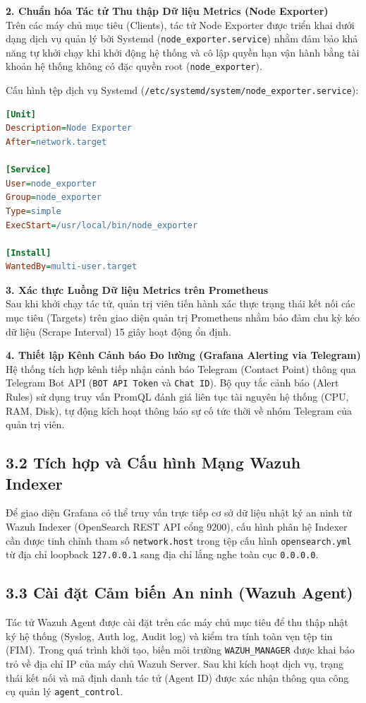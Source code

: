 \documentclass[13pt,a4paper]{extarticle}
\begin{document}
\textbf{2. Chuẩn hóa Tác tử Thu thập Dữ liệu Metrics (Node Exporter)}\\
Trên các máy chủ mục tiêu (Clients), tác tử Node Exporter được triển khai dưới dạng dịch vụ quản lý bởi Systemd (\texttt{node\_exporter.service}) nhằm đảm bảo khả năng tự khởi chạy khi khởi động hệ thống và cô lập quyền hạn vận hành bằng tài khoản hệ thống không có đặc quyền root (\texttt{node\_exporter}).

Cấu hình tệp dịch vụ Systemd (\texttt{/etc/systemd/system/node\_exporter.service}):

\begin{lstlisting}[language=ini]
[Unit]
Description=Node Exporter
After=network.target

[Service]
User=node_exporter
Group=node_exporter
Type=simple
ExecStart=/usr/local/bin/node_exporter

[Install]
WantedBy=multi-user.target
\end{lstlisting}

\textbf{3. Xác thực Luồng Dữ liệu Metrics trên Prometheus}\\
Sau khi khởi chạy tác tử, quản trị viên tiến hành xác thực trạng thái kết nối các mục tiêu (Targets) trên giao diện quản trị Prometheus nhằm bảo đảm chu kỳ kéo dữ liệu (Scrape Interval) 15 giây hoạt động ổn định.

\textbf{4. Thiết lập Kênh Cảnh báo Đo lường (Grafana Alerting via Telegram)}\\
Hệ thống tích hợp kênh tiếp nhận cảnh báo Telegram (Contact Point) thông qua Telegram Bot API (\texttt{BOT API Token} và \texttt{Chat ID}). Bộ quy tắc cảnh báo (Alert Rules) sử dụng truy vấn PromQL đánh giá liên tục tài nguyên hệ thống (CPU, RAM, Disk), tự động kích hoạt thông báo sự cố tức thời về nhóm Telegram của quản trị viên.

\subsection{3.2 Tích hợp và Cấu hình Mạng Wazuh Indexer}
Để giao diện Grafana có thể truy vấn trực tiếp cơ sở dữ liệu nhật ký an ninh từ Wazuh Indexer (OpenSearch REST API cổng 9200), cấu hình phân hệ Indexer cần được tinh chỉnh tham số \texttt{network.host} trong tệp cấu hình \texttt{opensearch.yml} từ địa chỉ loopback \texttt{127.0.0.1} sang địa chỉ lắng nghe toàn cục \texttt{0.0.0.0}.

\subsection{3.3 Cài đặt Cảm biến An ninh (Wazuh Agent)}
Tác tử Wazuh Agent được cài đặt trên các máy chủ mục tiêu để thu thập nhật ký hệ thống (Syslog, Auth log, Audit log) và kiểm tra tính toàn vẹn tệp tin (FIM). Trong quá trình khởi tạo, biến môi trường \texttt{WAZUH\_MANAGER} được khai báo trỏ về địa chỉ IP của máy chủ Wazuh Server. Sau khi kích hoạt dịch vụ, trạng thái kết nối và mã định danh tác tử (Agent ID) được xác nhận thông qua công cụ quản lý \texttt{agent\_control}.
\end{document}
